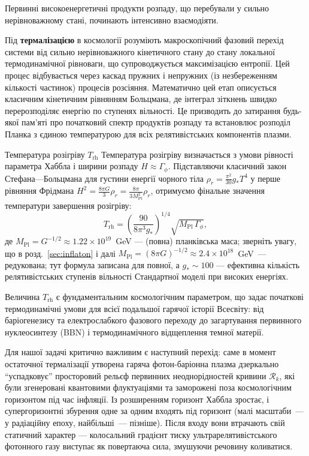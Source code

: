 Первинні високоенергетичні продукти розпаду, що перебували у сильно нерівноважному стані, починають інтенсивно взаємодіяти.

Під \textbf{термалізацією} в космології розуміють макроскопічний фазовий перехід системи від сильно нерівноважного кінетичного стану до стану локальної термодинамічної рівноваги, що супроводжується максимізацією ентропії. Цей процес відбувається через каскад пружних і непружних (із незбереженням кількості частинок) процесів розсіяння. Математично цей етап описується класичним кінетичним рівнянням Больцмана, де інтеграл зіткнень швидко перерозподіляє енергію по ступенях вільності. Це призводить до затирання будь-якої пам'яті про початковий спектр продуктів розпаду та встановлює розподіл Планка з єдиною температурою для всіх релятивістських компонентів плазми.

\begin{keybox}{Температура розігріву $T_\mathrm{rh}$}
Температура розігріву визначається з умови рівності параметра Хаббла і ширини розпаду $H \approx \Gamma_\phi$. Підставляючи класичний закон Стефана---Больцмана для густини енергії чорного тіла $\rho_r = \frac{\pi^2}{30}g_* T^4$ у перше рівняння Фрідмана $H^2 = \frac{8\pi G}{3}\rho_r = \frac{8\pi}{3 M_{\mathrm{Pl}}^2}\rho_r$, отримуємо фінальне значення температури завершення розігріву:
\begin{equation}\label{eq:t_reheating}
  T_\mathrm{rh}
    = \left(\frac{90}{8\pi^3 g_*}\right)^{\!1/4}
      \sqrt{M_\mathrm{Pl}\,\Gamma_\phi},
\end{equation}
де $M_{\mathrm{Pl}} = G^{-1/2} \approx 1.22 \times 10^{19}$~GeV --- (повна) планківська маса; зверніть увагу, що в розд.~\ref{sec:inflaton} і далі $M_{\mathrm{Pl}} = (8\pi G)^{-1/2}\approx 2.4\times10^{18}$~GeV~--- редукована; тут формула записана для повної, а $g_* \sim 100$ --- ефективна кількість релятивістських ступенів вільності Стандартної моделі при високих енергіях.
\end{keybox}

Величина $T_\mathrm{rh}$ є фундаментальним космологічним параметром, що задає початкові термодинамічні умови для всієї подальшої гарячої історії Всесвіту: від баріогенезису та електрослабкого фазового переходу до загартування первинного нуклеосинтезу (BBN) і термодинамічного відщеплення темної матерії.

Для нашої задачі критично важливим є наступний перехід: саме в момент остаточної термалізації утворена гаряча фотон-баріонна плазма дзеркально \enquote{ус\-пад\-ко\-вує} просторовий рельєф первинних неоднорідностей кривини $\mathcal{R}_k$, які були згенеровані квантовими флуктуаціями та заморожені поза космологічним горизонтом під час інфляції. Із розширенням горизонт Хаббла зростає, і супергоризонтні збурення одне за одним входять під горизонт (малі масштаби~--- у радіаційну епоху, найбільші~--- пізніше). Після входу вони втрачають свій статичний характер --- колосальний градієнт тиску ультрарелятивістського фотонного газу виступає як повертаюча сила, змушуючи речовину коливатися.

